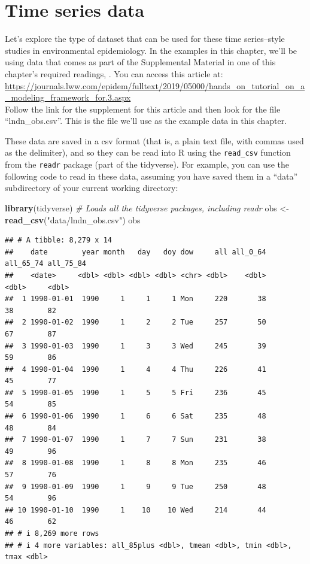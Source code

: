 \documentclass[
]{book}
\newenvironment{Shaded}{\begin{snugshade}}{\end{snugshade}}
\newcommand{\CommentTok}[1]{\textcolor[rgb]{0.56,0.35,0.01}{\textit{#1}}}
\newcommand{\FunctionTok}[1]{\textcolor[rgb]{0.13,0.29,0.53}{\textbf{#1}}}
\newcommand{\NormalTok}[1]{#1}
\newcommand{\OtherTok}[1]{\textcolor[rgb]{0.56,0.35,0.01}{#1}}
\newcommand{\StringTok}[1]{\textcolor[rgb]{0.31,0.60,0.02}{#1}}
\begin{document}
\section{Time series data}\label{time-series-data}

Let's explore the type of dataset that can be used for these
time series--style studies in environmental epidemiology. In the examples
in this chapter, we'll be using data that comes as part of the Supplemental
Material in one of this chapter's required readings, \citep{vicedo2019hands}.
You can access this article at: \url{https://journals.lww.com/epidem/fulltext/2019/05000/hands_on_tutorial_on_a_modeling_framework_for.3.aspx}\\
Follow the link for the supplement for this article and then look for the
file ``lndn\_obs.csv''. This is the file we'll use as the example data in this
chapter.

These data are saved in a csv format (that is, a plain text file, with commas
used as the delimiter), and so they can be read into R using the \texttt{read\_csv}
function from the \texttt{readr} package (part of the tidyverse). For example, you can
use the following code to read in these data, assuming you have saved them in a
``data'' subdirectory of your current working directory:

\begin{Shaded}
\begin{Highlighting}[]
\FunctionTok{library}\NormalTok{(tidyverse) }\CommentTok{\# Loads all the tidyverse packages, including readr}
\NormalTok{obs }\OtherTok{\textless{}{-}} \FunctionTok{read\_csv}\NormalTok{(}\StringTok{"data/lndn\_obs.csv"}\NormalTok{)}
\NormalTok{obs}
\end{Highlighting}
\end{Shaded}

\begin{verbatim}
## # A tibble: 8,279 x 14
##    date        year month   day   doy dow     all all_0_64 all_65_74 all_75_84
##    <date>     <dbl> <dbl> <dbl> <dbl> <chr> <dbl>    <dbl>     <dbl>     <dbl>
##  1 1990-01-01  1990     1     1     1 Mon     220       38        38        82
##  2 1990-01-02  1990     1     2     2 Tue     257       50        67        87
##  3 1990-01-03  1990     1     3     3 Wed     245       39        59        86
##  4 1990-01-04  1990     1     4     4 Thu     226       41        45        77
##  5 1990-01-05  1990     1     5     5 Fri     236       45        54        85
##  6 1990-01-06  1990     1     6     6 Sat     235       48        48        84
##  7 1990-01-07  1990     1     7     7 Sun     231       38        49        96
##  8 1990-01-08  1990     1     8     8 Mon     235       46        57        76
##  9 1990-01-09  1990     1     9     9 Tue     250       48        54        96
## 10 1990-01-10  1990     1    10    10 Wed     214       44        46        62
## # i 8,269 more rows
## # i 4 more variables: all_85plus <dbl>, tmean <dbl>, tmin <dbl>, tmax <dbl>
\end{verbatim}
\end{document}
